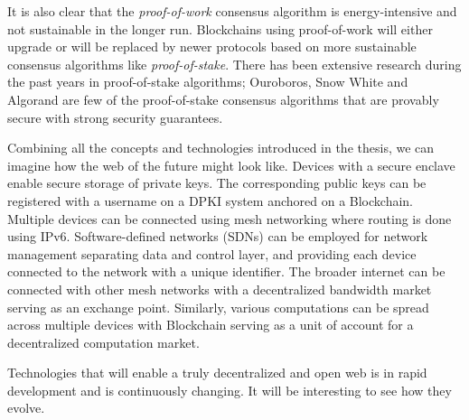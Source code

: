 It is also clear that the \textit{proof-of-work} consensus algorithm is energy-intensive and not sustainable in the longer run. Blockchains using proof-of-work will either upgrade or will be replaced by newer protocols based on more sustainable consensus algorithms like \textit{proof-of-stake}. There has been extensive research during the past years in proof-of-stake algorithms; Ouroboros\cite{kiayias2017ouroboros}, Snow White\cite{daian2017snow} and Algorand\cite{gilad2017algorand} are few of the proof-of-stake consensus algorithms that are provably secure with strong security guarantees.

Combining all the concepts and technologies introduced in the thesis, we can imagine how the web of the future might look like. Devices with a secure enclave enable secure storage of private keys. The corresponding public keys can be registered with a username on a DPKI system anchored on a Blockchain. Multiple devices can be connected using mesh networking where routing is done using IPv6. Software-defined networks (SDNs) can be employed for network management separating data and control layer, and providing each device connected to the network with a unique identifier. The broader internet can be connected with other mesh networks with a decentralized bandwidth market serving as an exchange point. Similarly, various computations can be spread across multiple devices with Blockchain serving as a unit of account for a decentralized computation market.

Technologies that will enable a truly decentralized and open web is in rapid development and is continuously changing. It will be interesting to see how they evolve.